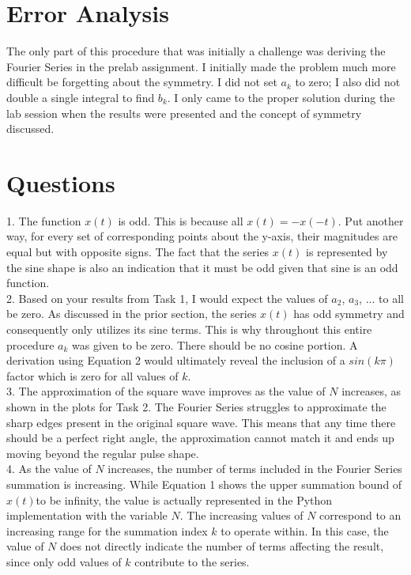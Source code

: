 \documentclass[12pt]{report}
\begin{document}
\section{Error Analysis}

The only part of this procedure that was initially a challenge was deriving the Fourier Series in the prelab assignment. I initially made the problem much more difficult be forgetting about the symmetry. I did not set $ a_k $ to zero; I also did not double a single integral to find $ b_k $. I only came to the proper solution during the lab session when the results were presented and the concept of symmetry discussed. \\

\section{Questions}

1. The function $ x(t) $ is odd. This is because all $ x(t) = -x(-t) $. Put another way, for every set of corresponding points about the y-axis, their magnitudes are equal but with opposite signs. The fact that the series $ x(t) $ is represented by the sine shape is also an indication that it must be odd given that sine is an odd function. \\

2. Based on your results from Task 1, I would expect the values of $ a_2 $, $ a_3 $, $ ... $ to all be zero. As discussed in the prior section, the series $ x(t) $ has odd symmetry and consequently only utilizes its sine terms. This is why throughout this entire procedure $ a_k $ was given to be zero. There should be no cosine portion. A derivation using Equation 2 would ultimately reveal the inclusion of a $ sin(k\pi) $ factor which is zero for all values of $ k $. \\ 

3. The approximation of the square wave improves as the value of $ N $ increases, as shown in the plots for Task 2. The Fourier Series struggles to approximate the sharp edges present in the original square wave. This means that any time there should be a perfect right angle, the approximation cannot match it and ends up moving beyond the regular pulse shape. \\

4. As the value of $ N $ increases, the number of terms included in the Fourier Series summation is increasing. While Equation 1 shows the upper summation bound of $ x(t) $to be infinity, the value is actually represented in the Python implementation with the variable $ N $. The increasing values of $ N $ correspond to an increasing range for the summation index $ k $ to operate within. In this case, the value of $ N $ does not directly indicate the number of terms affecting the result, since only odd values of $ k $ contribute to the series. \\
\end{document}
